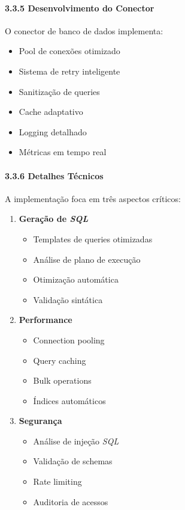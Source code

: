 \documentclass[
]{article}
\providecommand{\tightlist}{%
  \setlength{\itemsep}{0pt}\setlength{\parskip}{0pt}}
\begin{document}
\paragraph{3.3.5 Desenvolvimento do
Conector}\label{desenvolvimento-do-conector}

O conector de banco de dados implementa:

\begin{itemize}
\tightlist
\item
  Pool de conexões otimizado
\item
  Sistema de retry inteligente
\item
  Sanitização de queries
\item
  Cache adaptativo
\item
  Logging detalhado
\item
  Métricas em tempo real
\end{itemize}

\paragraph{3.3.6 Detalhes Técnicos}\label{detalhes-tuxe9cnicos-2}

A implementação foca em três aspectos críticos:

\begin{enumerate}
\def\labelenumi{\arabic{enumi}.}
\item
  \textbf{Geração de \emph{SQL}}

  \begin{itemize}
  \tightlist
  \item
    Templates de queries otimizadas
  \item
    Análise de plano de execução
  \item
    Otimização automática
  \item
    Validação sintática
  \end{itemize}
\item
  \textbf{Performance}

  \begin{itemize}
  \tightlist
  \item
    Connection pooling
  \item
    Query caching
  \item
    Bulk operations
  \item
    Índices automáticos
  \end{itemize}
\item
  \textbf{Segurança}

  \begin{itemize}
  \tightlist
  \item
    Análise de injeção \emph{SQL}
  \item
    Validação de schemas
  \item
    Rate limiting
  \item
    Auditoria de acessos
  \end{itemize}
\end{enumerate}
\end{document}
